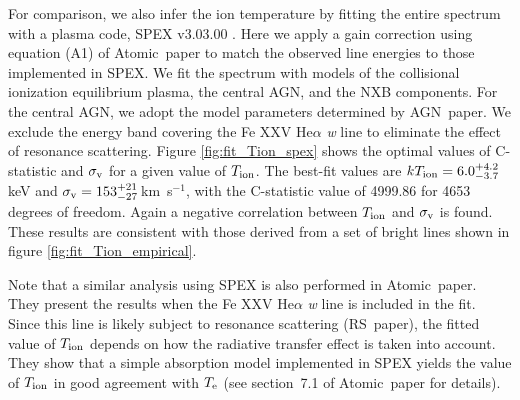 For comparison, we also infer the ion temperature by fitting the entire spectrum with a plasma code, SPEX v3.03.00 \citep{kaastra96}. Here we apply a gain correction using equation (A1) of Atomic~paper to match the observed line energies to those implemented in SPEX. We fit the spectrum with models of the collisional ionization equilibrium plasma, the central AGN, and the NXB components. For the central AGN, we adopt the model parameters determined by AGN~paper. We exclude the energy band covering the Fe XXV He$\alpha$ {\it w} line to eliminate the effect of resonance scattering. Figure \ref{fig:fit_Tion_spex} shows the optimal values of C-statistic and $\sigma_{\rm v}$ for a given value of $T_{\rm ion}$.  The best-fit values are $kT_{\rm ion}=6.0^{+4.2}_{-3.7}$\,keV and $\sigma_{\rm  v}=153^{+21}_{-27}$\,km~s$^{-1}$, with the C-statistic value of 4999.86 for 4653 degrees of freedom. Again a negative correlation between $T_{\rm ion}$ and $\sigma_{\rm v}$ is found. These results are consistent with those derived from a set of bright lines shown in figure \ref{fig:fit_Tion_empirical}.

Note that a similar analysis using SPEX is also performed in Atomic~paper. They present the results when the Fe XXV He$\alpha$ {\it w} line is included in the fit. Since this line is likely subject to resonance scattering (RS~paper), the fitted value of $T_{\rm ion}$ depends on how the radiative transfer effect is taken into account. They show that a simple absorption model implemented in SPEX yields the value of $T_{\rm ion}$ in good agreement with $T_{\rm e}$ (see section~7.1 of Atomic~paper for details).
